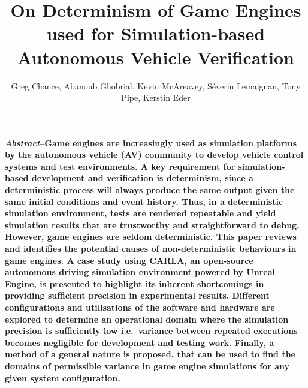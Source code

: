 \documentclass[runningheads,twocolumn,a4paper,10pt]{llncs}
\begin{document}

\mainmatter


\title{On Determinism of Game Engines used for Simulation-based Autonomous Vehicle Verification}




\author{Greg Chance, Abanoub Ghobrial, Kevin McAreavey, S\'everin Lemaignan, Tony Pipe, Kerstin Eder}

\maketitle

\makeatletter
\renewcommand\subsubsection{\@startsection{subsubsection}{3}{\z@}%
                       {-18\p@ \@plus -4\p@ \@minus -4\p@}%
                       {4\p@ \@plus 2\p@ \@minus 2\p@}%
                       {\normalfont\normalsize\bfseries\boldmath
                        \rightskip=\z@ \@plus 8em\pretolerance=10000 }}
\makeatother



\textbf{\textit{Abstract}--Game engines are increasingly used as simulation platforms by the autonomous vehicle (AV) community to develop vehicle control systems and test environments. 
%
A key requirement for simulation-based development and verification is determinism, since a deterministic process will always produce the same output given the same initial conditions and event history. 
%
Thus, in a deterministic simulation environment, tests are rendered repeatable and yield simulation results that are trustworthy and straightforward to debug. 
%
However, game engines are seldom deterministic. 
%
This paper reviews and identifies the potential causes of non-deterministic behaviours in game engines. 
%
A case study using CARLA, an open-source autonomous driving simulation environment powered by Unreal Engine, is presented to highlight its inherent shortcomings in providing sufficient precision in experimental results. 
%
Different configurations and utilisations of the software and hardware are explored to determine an operational domain where the simulation precision is sufficiently low i.e.\ variance between repeated executions becomes negligible for development and testing work. 
%
Finally, a method of a general nature is proposed, that can be used to find the domains of permissible variance in game engine simulations for any given system configuration.}  
\end{document}
